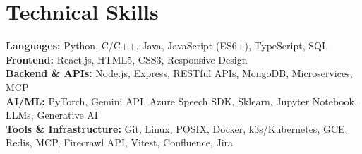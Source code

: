 \section{Technical Skills}
 \begin{itemize}[leftmargin=0.15in, label={}]
    \small{
        \item{
            \textbf{Languages: }{Python, C/C++, Java, JavaScript (ES6+), TypeScript, SQL} \\
            \textbf{Frontend: }{React.js, HTML5, CSS3, Responsive Design} \\
            \textbf{Backend \& APIs: }{Node.js, Express, RESTful APIs, MongoDB, Microservices, MCP} \\
            \textbf{AI/ML: }{PyTorch, Gemini API, Azure Speech SDK, Sklearn, Jupyter Notebook, LLMs, Generative AI} \\
            \textbf{Tools \& Infrastructure: }{Git, Linux, POSIX, Docker, k3s/Kubernetes, GCE, Redis, MCP, Firecrawl API, Vitest, Confluence, Jira}
        }
    }
 \end{itemize}
